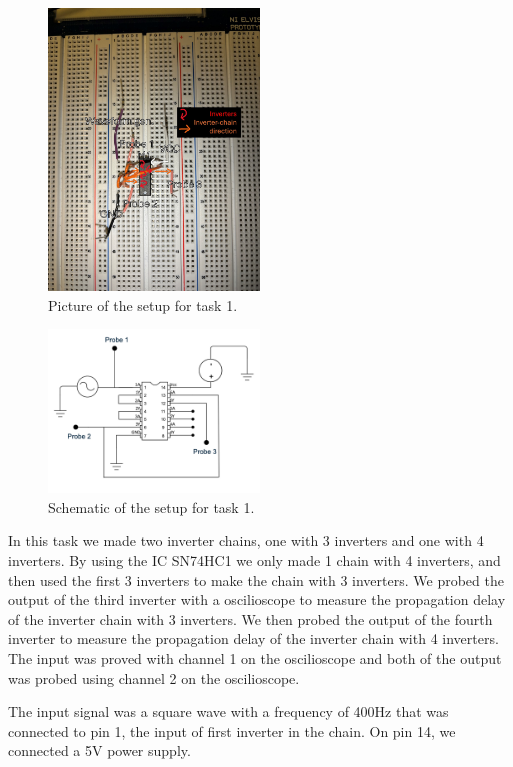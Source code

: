 \documentclass[onecolumn]{article}
\begin{document}
\begin{figure}[h!]
    \centering
    \includegraphics[width=0.5\textwidth]{Circuit_draw.jpg}
    \caption{Picture of the setup for task 1.}  
    \label{fig:circuit}
\end{figure}

\begin{figure}[h!]
    \centering
    \includegraphics[width=0.5\textwidth]{circuit_schematics.png}
    \caption{Schematic of the setup for task 1.}
    \label{fig:schematic}
\end{figure}

In this task we made two inverter chains, one with 3 inverters and one with 4 inverters. By using the IC SN74HC1 we only made 1 chain with 4 inverters, and then used the first 3 inverters to make the chain with 3 inverters. We probed the output of the third inverter with a oscilioscope to measure the propagation delay of the inverter chain with 3 inverters. We then probed the output of the fourth inverter to measure the propagation delay of the inverter chain with 4 inverters. The input was proved with channel 1 on the oscilioscope and both of the output was probed using channel 2 on the oscilioscope.

The input signal was a square wave with a frequency of 400Hz that was connected to pin 1, the input of first inverter in the chain. On pin 14, we connected a 5V power supply. 
\end{document}
